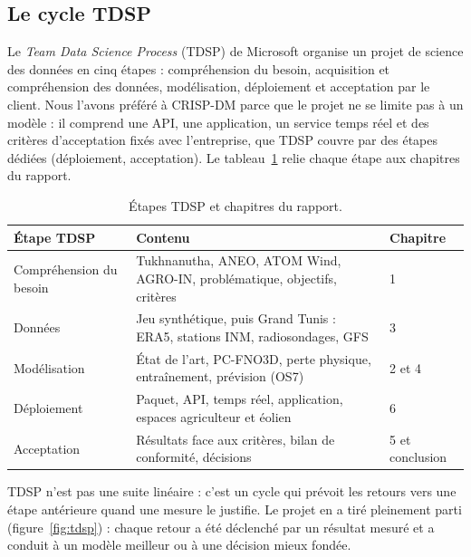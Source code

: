 \subsection{Le cycle TDSP}
Le \emph{Team Data Science Process} (TDSP) de Microsoft organise un projet de science des données
en cinq étapes : compréhension du besoin, acquisition et compréhension des données, modélisation,
déploiement et acceptation par le client. Nous l'avons préféré à CRISP-DM parce que le projet ne
se limite pas à un modèle : il comprend une API, une application, un service temps réel et des
critères d'acceptation fixés avec l'entreprise, que TDSP couvre par des étapes dédiées
(déploiement, acceptation). Le tableau~\ref{tab:tdsp} relie chaque étape aux chapitres du rapport.

\begin{table}[H]
\centering
\caption{Étapes TDSP et chapitres du rapport.}
\label{tab:tdsp}
\begin{tabularx}{\linewidth}{@{}lXl@{}}
\toprule
Étape TDSP & Contenu & Chapitre\\
\midrule
Compréhension du besoin & Tukhnanutha, ANEO, ATOM Wind, AGRO-IN, problématique, objectifs, critères & 1\\
Données & Jeu synthétique, puis Grand Tunis : ERA5, stations INM, radiosondages, GFS & 3\\
Modélisation & État de l'art, PC-FNO3D, perte physique, entraînement, prévision (OS7) & 2 et 4\\
Déploiement & Paquet, API, temps réel, application, espaces agriculteur et éolien & 6\\
Acceptation & Résultats face aux critères, bilan de conformité, décisions & 5 et conclusion\\
\bottomrule
\end{tabularx}
\end{table}

TDSP n'est pas une suite linéaire : c'est un cycle qui prévoit les retours vers une étape
antérieure quand une mesure le justifie. Le projet en a tiré pleinement parti
(figure~\ref{fig:tdsp}) : chaque retour a été déclenché par un résultat mesuré et a conduit à un
modèle meilleur ou à une décision mieux fondée.

